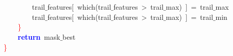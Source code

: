 \mbox{} \\
\mbox{} \\
\mbox{}\ \ \ \ \ \ \ \ trail$\_$features\textcolor{BrickRed}{[}\ which\textcolor{BrickRed}{(}trail$\_$features\ \textcolor{BrickRed}{\textgreater{}}\ trail$\_$max\textcolor{BrickRed}{)}\ \textcolor{BrickRed}{]}\ \textcolor{BrickRed}{=}\ trail$\_$max \\
\mbox{}\ \ \ \ \ \ \ \ trail$\_$features\textcolor{BrickRed}{[}\ which\textcolor{BrickRed}{(}trail$\_$features\ \textcolor{BrickRed}{\textgreater{}}\ trail$\_$max\textcolor{BrickRed}{)}\ \textcolor{BrickRed}{]}\ \textcolor{BrickRed}{=}\ trail$\_$min \\
\mbox{}\ \ \ \ \textcolor{Red}{\}} \\
\mbox{}\ \ \ \ \textbf{\textcolor{Blue}{return}}\ mask$\_$best \\
\mbox{}\textcolor{Red}{\}} \\
\mbox{}
